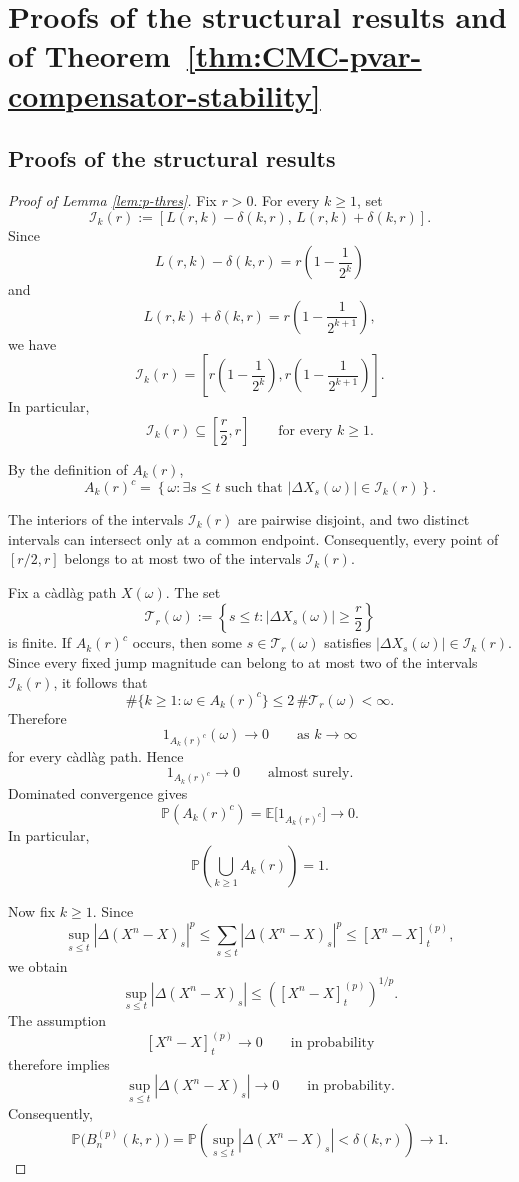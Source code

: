 \documentclass[a4paper,10pt]{article}
\newcommand{\E}{\mathbb E}
\renewcommand{\P}{\mathbb P}
\begin{document}
\section{Proofs of the structural results and of
Theorem~\ref{thm:CMC-pvar-compensator-stability}}
\label{sec:proof}

\subsection{Proofs of the structural results}




\begin{proof}[Proof of Lemma \ref{lem:p-thres}]
Fix \(r>0\). For every \(k\ge1\), set
\[
\mathcal I_k(r)
:=
[L(r,k)-\delta(k,r),\,L(r,k)+\delta(k,r)].
\]
Since
\[
L(r,k)-\delta(k,r)
=
r\left(1-\frac1{2^k}\right)
\]
and
\[
L(r,k)+\delta(k,r)
=
r\left(1-\frac1{2^{k+1}}\right),
\]
we have
\[
\mathcal I_k(r)
=
\left[
r\left(1-\frac1{2^k}\right),
r\left(1-\frac1{2^{k+1}}\right)
\right].
\]
In particular,
\[
\mathcal I_k(r)\subseteq\left[\frac r2,r\right]
\qquad\text{for every }k\ge1.
\]

By the definition of \(A_k(r)\),
\[
A_k(r)^c
=
\left\{
\omega:
\exists s\le t
\text{ such that }
|\Delta X_s(\omega)|\in \mathcal I_k(r)
\right\}.
\]

The interiors of the intervals \(\mathcal I_k(r)\) are pairwise disjoint, and
two distinct intervals can intersect only at a common endpoint.
Consequently, every point of \([r/2,r]\) belongs to at most two of the
intervals \(\mathcal I_k(r)\).

Fix a càdlàg path \(X(\omega)\). The set
\[
\mathcal T_r(\omega)
:=
\left\{
s\le t:
|\Delta X_s(\omega)|\ge\frac r2
\right\}
\]
is finite. If \(A_k(r)^c\) occurs, then some
\(s\in\mathcal T_r(\omega)\) satisfies
$
|\Delta X_s(\omega)|\in \mathcal I_k(r).
$
Since every fixed jump magnitude can belong to at most two of the
intervals \(\mathcal I_k(r)\), it follows that
\[
\#\{k\ge1:\omega\in A_k(r)^c\}
\le
2\,\#\mathcal T_r(\omega)
<\infty.
\]
Therefore
\[
1_{A_k(r)^c}(\omega)\longrightarrow0
\qquad\text{as }k\to\infty
\]
for every càdlàg path. Hence
\[
1_{A_k(r)^c}\longrightarrow0
\qquad\text{almost surely}.
\]
Dominated convergence gives
\[
\P(A_k(r)^c)
=
\E\bigl[1_{A_k(r)^c}\bigr]
\longrightarrow0.
\]
In particular,
\[
\P\left(\bigcup_{k\ge1}A_k(r)\right)=1.
\]

Now fix \(k\ge1\). Since
\[
\sup_{s\le t}
|\Delta(X^n-X)_s|^p
\le
\sum_{s\le t}
|\Delta(X^n-X)_s|^p
\le
[X^n-X]^{(p)}_t,
\]
we obtain
\[
\sup_{s\le t}
|\Delta(X^n-X)_s|
\le
\left(
[X^n-X]^{(p)}_t
\right)^{1/p}.
\]
The assumption
\[
[X^n-X]^{(p)}_t\longrightarrow0
\qquad\text{in probability}
\]
therefore implies
\[
\sup_{s\le t}
|\Delta(X^n-X)_s|
\longrightarrow0
\qquad\text{in probability}.
\]
Consequently,
\[
\P\bigl(B_n^{(p)}(k,r)\bigr)
=
\P\left(
\sup_{s\le t}
|\Delta(X^n-X)_s|
<
\delta(k,r)
\right)
\longrightarrow1.
\]


\end{proof}
\end{document}
